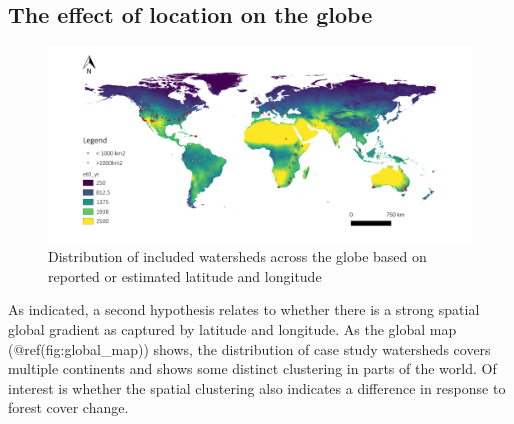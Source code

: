 \documentclass[]{elsarticle} %
\begin{document}
\hypertarget{the-effect-of-location-on-the-globe}{%
\subsection{The effect of location on the
globe}\label{the-effect-of-location-on-the-globe}}

\begin{figure}
\includegraphics[width=0.9\linewidth]{../../data/FAOET0data} \caption{Distribution of included watersheds across the globe based on reported or estimated latitude and longitude}\label{fig:global_map}
\end{figure}

As indicated, a second hypothesis relates to whether there is a strong
spatial global gradient as captured by latitude and longitude. As the
global map (@ref(fig:global\_map)) shows, the distribution of case study
watersheds covers multiple continents and shows some distinct clustering
in parts of the world. Of interest is whether the spatial clustering
also indicates a difference in response to forest cover change.
\end{document}
